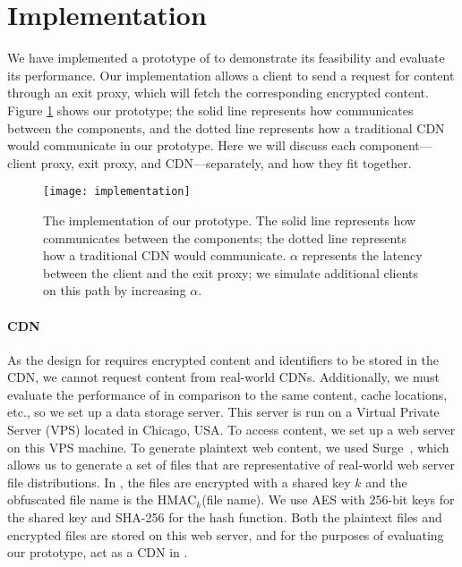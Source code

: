 \section{Implementation}
\label{sec:implementation}

We have implemented a prototype of \system{} to demonstrate its feasibility and 
evaluate its performance.  Our implementation allows a client to send a request 
for content through an exit proxy, which will fetch the corresponding 
encrypted content.  Figure \ref{fig:impl} shows our prototype; the solid line represents
how \system{} communicates between the components, and the dotted line represents how 
a traditional CDN would communicate in our prototype.  Here we will discuss each component---client proxy, exit proxy, 
and CDN---separately, and how they fit together.

\begin{figure}[t]
\centering
\texttt{[image: implementation]}
\caption{The implementation of our \system{} prototype.  The solid line represents
how \system{} communicates between the components; the dotted line represents how 
a traditional CDN would communicate. $\alpha$ represents the latency between the client 
and the exit proxy; we simulate additional clients on this path by increasing $\alpha$.}
\label{fig:impl}
\end{figure}

\paragraph{CDN} As the design for \system{} requires encrypted content and identifiers
to be stored in the CDN, we cannot request content from real-world CDNs.  Additionally, 
we must evaluate the performance of \system{} in comparison to the same content, cache locations, etc., so 
we set up a data storage server.  This server is run on a Virtual Private Server
(VPS) located in
Chicago, USA.  To access content, we set up a web server on this VPS machine.  To generate 
plaintext web content, we used Surge~\cite{barford1998generating}, which allows us 
to generate a set of files that are representative of real-world web server file distributions.  
In \system{}, the files are encrypted with a shared key $k$ and the obfuscated file name is the 
HMAC$_{k}$(file name).  We use AES with 256-bit keys for the shared key and SHA-256
for the 
hash function.  Both the plaintext files and encrypted files are stored on this web server, and 
for the purposes of evaluating our prototype, act as a CDN in \system{}.

